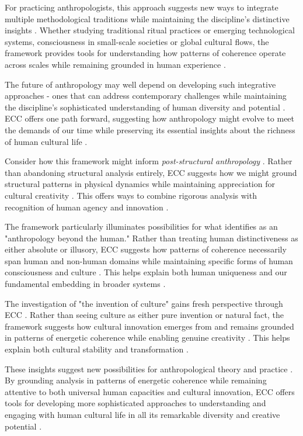 For practicing anthropologists, this approach suggests new ways to integrate multiple methodological traditions while maintaining the discipline's distinctive insights \cite{rabinow2008marking, fischer2018anthropology}. Whether studying traditional ritual practices or emerging technological systems, consciousness in small-scale societies or global cultural flows, the framework provides tools for understanding how patterns of coherence operate across scales while remaining grounded in human experience \cite{pink2016digital}.

The future of anthropology may well depend on developing such integrative approaches - ones that can address contemporary challenges while maintaining the discipline's sophisticated understanding of human diversity and potential \cite{ortner2016dark, moore2011still}. ECC offers one path forward, suggesting how anthropology might evolve to meet the demands of our time while preserving its essential insights about the richness of human cultural life \cite{haraway2016staying, tsing2015mushroom}.

Consider how this framework might inform \textit{post-structural anthropology} \cite{viveiros2014cannibal, latour2005reassembling}. Rather than abandoning structural analysis entirely, ECC suggests how we might ground structural patterns in physical dynamics while maintaining appreciation for cultural creativity \cite{bourdieu1977outline}. This offers ways to combine rigorous analysis with recognition of human agency and innovation \cite{jackson1989paths, ingold2011being}.

The framework particularly illuminates possibilities for what \cite{kohn2013how, haraway2003companion} identifies as an "anthropology beyond the human." Rather than treating human distinctiveness as either absolute or illusory, ECC suggests how patterns of coherence necessarily span human and non-human domains while maintaining specific forms of human consciousness and culture \cite{tsing2015mushroom}. This helps explain both human uniqueness and our fundamental embedding in broader systems \cite{latour1993modern, ingold2011being}.

The investigation of "the invention of culture" gains fresh perspective through ECC \cite{wagner2016invention, strathern1980nature}. Rather than seeing culture as either pure invention or natural fact, the framework suggests how cultural innovation emerges from and remains grounded in patterns of energetic coherence while enabling genuine creativity \cite{ingold2013making}. This helps explain both cultural stability and transformation \cite{bateson2000steps, csordas1990embodiment}.

These insights suggest new possibilities for anthropological theory and practice \cite{rabinow2008marking, fischer2018anthropology}. By grounding analysis in patterns of energetic coherence while remaining attentive to both universal human capacities and cultural innovation, ECC offers tools for developing more sophisticated approaches to understanding and engaging with human cultural life in all its remarkable diversity and creative potential \cite{haraway2016staying, moore2011still}.